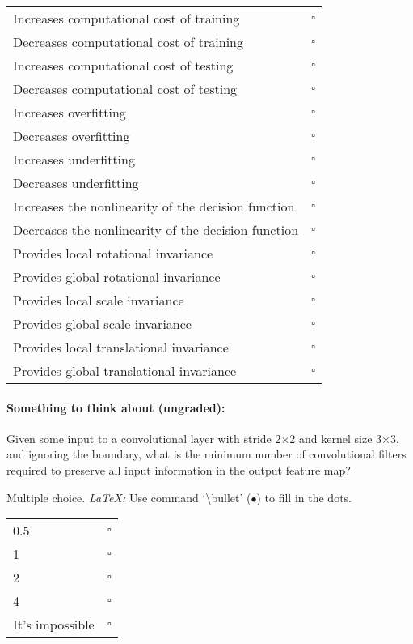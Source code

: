 \begin{tabular}[h]{lr}
\toprule
Increases computational cost of training & $\square$ \\
Decreases computational cost of training & $\square$ \\
Increases computational cost of testing & $\square$ \\
Decreases computational cost of testing & $\square$ \\
\midrule
Increases overfitting & $\square$ \\
Decreases overfitting & $\square$ \\
Increases underfitting & $\square$ \\
Decreases underfitting & $\square$ \\
\midrule
Increases the nonlinearity of the decision function & $\square$ \\
Decreases the nonlinearity of the decision function & $\square$ \\
\midrule
Provides local rotational invariance & $\square$ \\
Provides global rotational invariance & $\square$ \\
Provides local scale invariance & $\square$ \\
Provides global scale invariance & $\square$ \\
Provides local translational invariance & $\square$ \\
Provides global translational invariance & $\square$ \\
\bottomrule
\end{tabular}


\paragraph{Something to think about (ungraded):} Given some input to a convolutional layer with stride 2$\times$2 and kernel size 3$\times$3, and ignoring the boundary, what is the minimum number of convolutional filters required to preserve all input information in the output feature map?

Multiple choice.
\emph{LaTeX:} Use command  `\textbackslash bullet' ($\bullet$) to fill in the dots.

\begin{tabular}[h]{lc}
\toprule
0.5 & $\square$ \\
1 & $\square$ \\
2 & $\square$ \\
4 & $\square$ \\
It's impossible & $\square$ \\
\bottomrule
\end{tabular}

